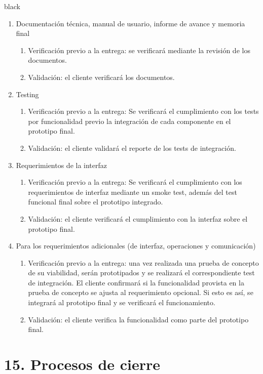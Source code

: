 \documentclass[
11pt, %
]{charter}
\begin{document}
\begin{consigna}{black}
\begin{enumerate}
		\item Documentación técnica, manual de usuario, informe de avance y memoria final
		\begin{enumerate}				
			\item Verificación previo a la entrega: se verificará mediante la revisión de los documentos.			
			\item Validación: el cliente verificará los documentos.			
		\end{enumerate}			
		\item Testing
		\begin{enumerate}				
			\item Verificación previo a la entrega: Se verificará el cumplimiento con los tests por funcionalidad previo la integración de cada componente en el prototipo final. 
			\item Validación: el cliente validará el reporte de los tests de integración.
		\end{enumerate}			
		\item Requerimientos de la interfaz		
		\begin{enumerate}			
			\item Verificación previo a la entrega: Se verificará el cumplimiento con los requerimientos de interfaz mediante un smoke test, además del test funcional final sobre el prototipo integrado.			
			\item Validación: el cliente verificará el cumplimiento con la interfaz sobre el prototipo final.		
		\end{enumerate}	
		\item Para los requerimientos adicionales (de interfaz, operaciones y comunicación)
		\begin{enumerate}			
			\item Verificación previo a la entrega: una vez realizada una prueba de concepto de su viabilidad, serán prototipados y se realizará el correspondiente test de integración. El cliente confirmará si la funcionalidad provista en la prueba de concepto se ajusta al requerimiento opcional. Si esto es así, se integrará al prototipo final y se verificará el funcionamiento.
			\item Validación: el cliente verifica la funcionalidad como parte del prototipo final.
	\end{enumerate}
\end{enumerate}


\end{consigna}

\section{15. Procesos de cierre}   
\label{sec:cierre}
\end{document}
